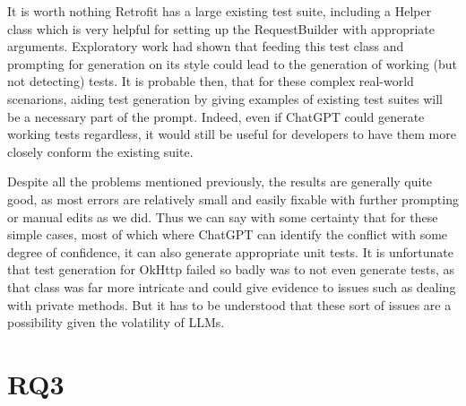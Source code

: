 It is worth nothing Retrofit has a large existing test suite, including a Helper class which is very helpful for setting up the RequestBuilder with appropriate arguments.
Exploratory work had shown that feeding this test class and prompting for generation on its style could lead to the generation of working (but not detecting) tests. It is probable then,
that for these complex real-world scenarions, aiding test generation by giving examples of existing test suites will be a necessary part of the prompt. Indeed, even if ChatGPT could generate
working tests regardless, it would still be useful for developers to have them more closely conform the existing suite.

Despite all the problems mentioned previously, the results are generally quite good, as most errors are relatively small and easily fixable with further prompting or manual edits as we did.
Thus we can say with some certainty that for these simple cases, most of which where ChatGPT can identify the conflict with some degree of confidence, it can also generate appropriate unit tests.
It is unfortunate that test generation for OkHttp failed so badly was to not even generate tests, as that class was far more intricate and could give evidence to issues such as dealing with
private methods. But it has to be understood that these sort of issues are a possibility given the volatility of LLMs.

\section{RQ3}\label{sec:results:rq3}



